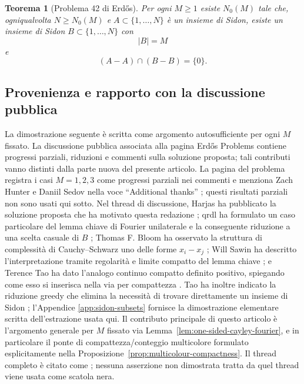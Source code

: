 \documentclass[11pt]{article}
\numberwithin{equation}{section}
\newtheorem{theorem}{Teorema}[section]
\newcommand{\1}{\mathbf 1}
\begin{document}
\begin{theorem}[Problema 42 di Erd\H{o}s]
\label{thm:erdos42}
Per ogni \(M\ge 1\) esiste \(N_0(M)\) tale che, ogniqualvolta \(N\ge N_0(M)\) e \(A\subset\{1,\ldots,N\}\) è un insieme di Sidon, esiste un insieme di Sidon \(B\subset\{1,\ldots,N\}\) con
\[
        |B|=M
\]
e
\[
        (A-A)\cap(B-B)=\{0\}.
\]
\end{theorem}

\subsection*{Provenienza e rapporto con la discussione pubblica}
La dimostrazione seguente è scritta come argomento autosufficiente per ogni
\(M\) fissato. La discussione pubblica associata alla pagina Erd\H{o}s
Problems contiene progressi parziali, riduzioni e commenti sulla soluzione
proposta; tali contributi vanno distinti dalla parte nuova del presente
articolo. La pagina del problema registra i casi \(M=1,2,3\) come progressi
parziali nei commenti e menziona Zach Hunter e Daniil Sedov nella voce
``Additional thanks'' \cite{BloomErdos42}; questi risultati parziali non sono
usati qui sotto. Nel thread di discussione, Harjas ha pubblicato la soluzione
proposta che ha motivato questa redazione \cite{HarjasProposedSolution}; qrdl
ha formulato un caso particolare del lemma chiave di Fourier unilaterale e la
conseguente riduzione a una scelta casuale di \(B\) \cite{qrdlKeyLemma};
Thomas F. Bloom ha osservato la struttura di complessità di Cauchy--Schwarz
uno delle forme \(x_i-x_j\) \cite{BloomComplexity}; Will Sawin ha descritto
l'interpretazione tramite regolarità e limite compatto del lemma chiave
\cite{SawinCompactLimit}; e Terence Tao ha dato l'analogo continuo compatto
definito positivo, spiegando come esso si inserisca nella via per compattezza
\cite{TaoContinuousAnalogue}. Tao ha inoltre indicato la riduzione greedy che
elimina la necessità di trovare direttamente un insieme di Sidon
\cite{TaoGreedyReduction}; l'Appendice \ref{app:sidon-subsets} fornisce la
dimostrazione elementare scritta dell'estrazione usata qui. Il contributo
principale di questo articolo è l'argomento generale per \(M\) fissato via
Lemma~\ref{lem:one-sided-cayley-fourier}, e in particolare il ponte di
compattezza/conteggio multicolore formulato esplicitamente nella
Proposizione~\ref{prop:multicolour-compactness}. Il thread completo è citato
come \cite{Erdos42Discussion}; nessuna asserzione non dimostrata tratta da
quel thread viene usata come scatola nera.
\end{document}
